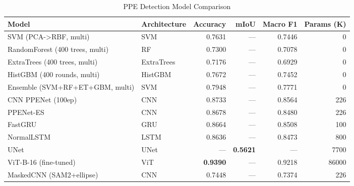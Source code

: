 \begin{table}[h]
\centering
\caption{PPE Detection Model Comparison}
\label{tab:model_comparison}
\begin{tabular}{llrrrr}
\toprule
Model & Architecture & Accuracy & mIoU & Macro F1 & Params (K) \\ \midrule
SVM (PCA->RBF, multi) & SVM & 0.7631 & — & 0.7446 & 0 \\
RandomForest (400 trees, multi) & RF & 0.7300 & — & 0.7078 & 0 \\
ExtraTrees (400 trees, multi) & ExtraTrees & 0.7176 & — & 0.6929 & 0 \\
HistGBM (400 rounds, multi) & HistGBM & 0.7672 & — & 0.7452 & 0 \\
Ensemble (SVM+RF+ET+GBM, multi) & SVM & 0.7948 & — & 0.7771 & 0 \\
CNN PPENet (100ep) & CNN & 0.8733 & — & 0.8564 & 226 \\
PPENet-ES & CNN & 0.8678 & — & 0.8480 & 226 \\
FastGRU & GRU & 0.8664 & — & 0.8508 & 100 \\
NormalLSTM & LSTM & 0.8636 & — & 0.8473 & 800 \\
UNet & UNet & — & \textbf{0.5621} & — & 7700 \\
ViT-B-16 (fine-tuned) & ViT & \textbf{0.9390} & — & 0.9218 & 86000 \\
MaskedCNN (SAM2+ellipse) & CNN & 0.7448 & — & 0.7374 & 226 \\
\bottomrule
\end{tabular}
\end{table}
